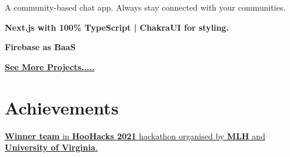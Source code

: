 \documentclass[]{deedy-resume-openfont}
\begin{document}
\begin{minipage}[t]{0.67\textwidth}

A community-based chat app. Always stay connected with your communities.\\
\begin{tightemize}
\item \textbf{Next.js with 100\% TypeScript | ChakraUI for styling.}
\item \textbf{Firebase as BaaS}
\end{tightemize}
\sectionsep
\href{https://kishans.in/projects}{\bf{See More Projects.....}}


\section{Achievements} 
\href{https://devpost.com/software/finlearn}{{\textbf{Winner team}} in \textbf{HooHacks 2021} hackathon organised by \textbf{MLH} and \textbf{University of Virginia}.}

\end{minipage} 
\end{document}

